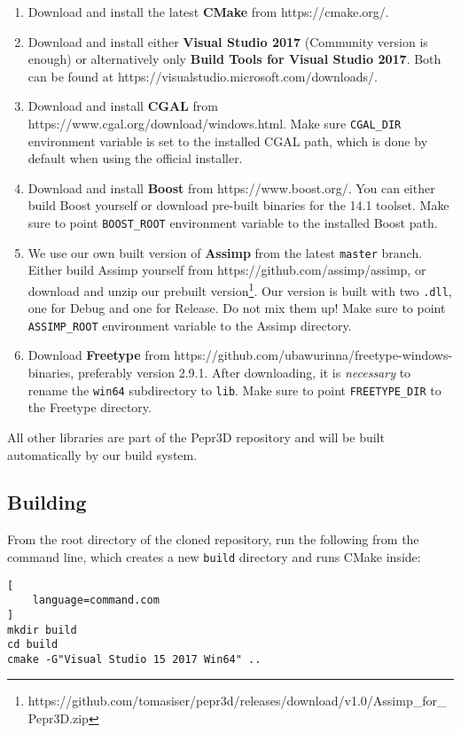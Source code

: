 \begin{enumerate}
\item Download and install the latest \textbf{CMake} from https://cmake.org/.
\item Download and install either \textbf{Visual Studio 2017} (Community version is enough) or alternatively only \textbf{Build Tools for Visual Studio 2017}. Both can be found at https://visualstudio.microsoft.com/downloads/.
\item Download and install \textbf{CGAL} from https://www.cgal.org/\-download/\-win\-dows.html. Make sure \texttt{CGAL\_DIR} environment variable is set to the installed CGAL path, which is done by default when using the official installer.
\item Download and install \textbf{Boost} from https://www.boost.org/. You can either build Boost yourself or download pre-built binaries for the 14.1 toolset. Make sure to point \texttt{BOOST\_ROOT} environment variable to the installed Boost path.
\item We use our own built version of \textbf{Assimp} from the latest \texttt{master} branch. Either build Assimp yourself from https://github.com/assimp/assimp, or download and unzip our prebuilt version\footnote{https://github.com/tomasiser/pepr3d/releases/download/v1.0/Assimp\_for\_Pepr3D.zip}. Our version is built with two \texttt{.dll}, one for Debug and one for Release. Do not mix them up! Make sure to point \texttt{ASSIMP\_ROOT} environment variable to the Assimp directory.
\item Download \textbf{Freetype} from https://github.com/\-ubawurinna/\-freetype-\-win\-dows-\-binaries, preferably version 2.9.1. After downloading, it is \emph{necessary} to rename the \texttt{win64} subdirectory to \texttt{lib}. Make sure to point \texttt{FREETYPE\_DIR} to the Freetype directory.
\end{enumerate}

All other libraries are part of the Pepr3D repository and will be built automatically by our build system.

\subsection{Building}

From the root directory of the cloned repository, run the following from the command line, which creates a new \texttt{build} directory and runs CMake inside:

\begin{lstlisting}[
    language=command.com
]
mkdir build
cd build
cmake -G"Visual Studio 15 2017 Win64" ..
\end{lstlisting}

